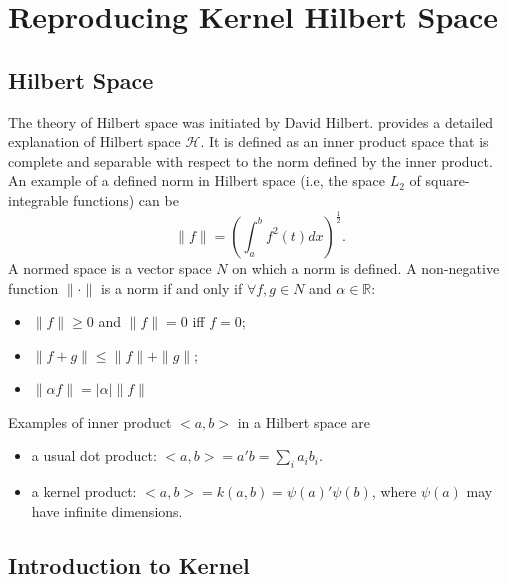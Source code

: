 
\section{Reproducing Kernel Hilbert Space} 

\subsection{Hilbert Space}
The theory of Hilbert space was initiated by David Hilbert. \citet{debnath2005introduction} provides a detailed explanation of Hilbert space $\mathcal{H}$. It is defined as an inner product space that is complete and separable with respect to the norm defined by the inner product.
An example of a defined norm in Hilbert space (i.e, the space $L_2$ of square-integrable functions) can be 
\begin{equation*}
    \parallel f \parallel = \left(\int_a^b f^2(t)dx\right)^\frac{1}{2}.
\end{equation*}
A normed space is a vector space $N$ on which a norm is defined. A non-negative function $\parallel\cdot\parallel$ is a norm if and only if $\forall f,g\in N$ and $\alpha\in\mathbb{R}$:
\begin{itemize}
    \item $\parallel f \parallel \geq 0$ and $\parallel f\parallel=0$ iff $f=0$;
    \item $\parallel f+g \parallel \leq \parallel f \parallel + \parallel g \parallel$;
    \item $\parallel \alpha f\parallel=\mid \alpha \mid \parallel f \parallel$
\end{itemize}
Examples of inner product $<a,b>$ in a Hilbert space are
\begin{itemize}
    \item a usual dot product: $<a,b>=a'b=\sum_i a_i b_i$.
    \item a kernel product: $<a,b>=k(a,b)=\psi(a)'\psi(b)$, where $\psi(a)$ may have infinite dimensions.
\end{itemize} 

\subsection{Introduction to Kernel}

